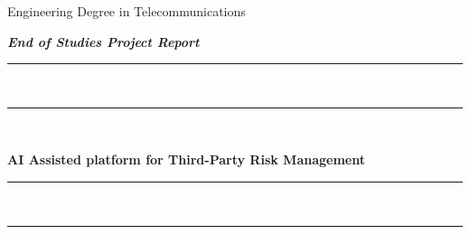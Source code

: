 \thispagestyle{empty}
\begin{titlepage}
\vspace*{-3cm} %
\begin{center}

{
  \fontsize{3pt}{3pt}\selectfont%
    



}



\vspace{30pt} {%
  \renewcommand*{\familydefault}{\defaultFont}
  \fontsize{25pt}{25pt}\selectfont%
Engineering Degree in Telecommunications\\%
}

\vspace{60pt}%
\fontsize{15pt}{15pt}\selectfont%
\textbf{\textit{End of Studies Project Report}}\\

\vspace{20pt} {%
  \begin{spacing}{0.05}
    \rule{300pt}{2pt}\\
    \rule{300pt}{0.75pt}\\
  \end{spacing}
  \renewcommand*{\familydefault}{\defaultFont}
  \fontsize{21pt}{21pt}\selectfont%
  \vspace{20pt}
  \textbf{
  AI Assisted platform for Third-Party Risk Management\\%
  }
  \vspace{10pt}
  \begin{spacing}{0.05}
    \rule{300pt}{0.75pt}\\
    \rule{300pt}{2pt}\\
  \end{spacing}
}



\end{center}
\end{titlepage}
